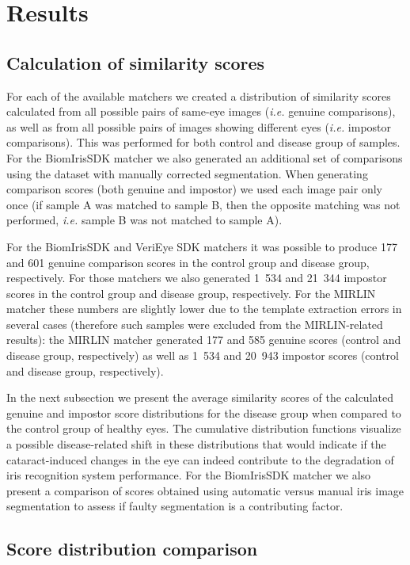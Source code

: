 \documentclass[a4paper]{spie}
\begin{document}
\section{Results}

\subsection{Calculation of similarity scores}
For each of the available matchers we created a distribution of similarity scores calculated from all possible pairs of same-eye images (\emph{i.e.} genuine comparisons), as well as from all possible pairs of images showing different eyes (\emph{i.e.} impostor comparisons). This was performed for both control and disease group of samples. For the BiomIrisSDK matcher we also generated an additional set of comparisons using the dataset with manually corrected segmentation. When generating comparison scores (both genuine and impostor) we used each image pair only once (if sample A was matched to sample B, then the opposite matching was not performed, \emph{i.e.} sample B was not matched to sample A).

For the BiomIrisSDK and VeriEye SDK matchers it was possible to produce 177 and 601 genuine comparison scores in the control group and disease group, respectively. For those matchers we also generated 1~534 and 21~344 impostor scores in the control group and disease group, respectively. For the MIRLIN matcher these numbers are slightly lower due to the template extraction errors in several cases (therefore such samples were excluded from the MIRLIN-related results): the MIRLIN matcher generated 177 and 585 genuine scores (control and disease group, respectively) as well as 1~534 and 20~943 impostor scores (control and disease group, respectively).

In the next subsection we present the average similarity scores of the calculated genuine and impostor score distributions for the disease group when compared to the control group of healthy eyes. The cumulative distribution functions visualize a possible disease-related shift in these distributions that would indicate if the cataract-induced changes in the eye can indeed contribute to the degradation of iris recognition system performance. For the BiomIrisSDK matcher we also present a comparison of scores obtained using automatic versus manual iris image segmentation to assess if faulty segmentation is a contributing factor.

\subsection{Score distribution comparison}
\end{document}
